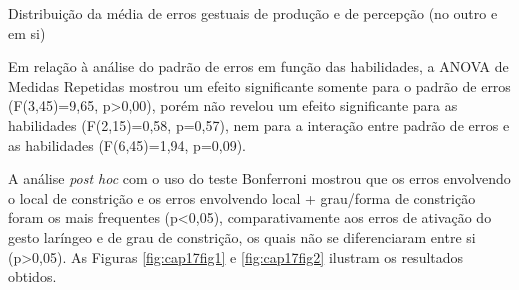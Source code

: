 \documentclass[output=paper,colorlinks,citecolor=brown,booklanguage=portuguese]{langscibook}
\begin{document}
\begin{Tabela}
    \caption{{Distribuição da média de erros gestuais de produção e de percepção (no outro e em si) \citep[96]{Berti2019}}}
    \label{tab:cap17tab2}
\end{Tabela}

Em relação à análise do padrão de erros em função das habilidades, a ANOVA de Medidas Repetidas mostrou um efeito significante somente para o padrão de erros (F(3,45)=9,65, p>0,00), porém não revelou um efeito significante para as habilidades (F(2,15)=0,58, p=0,57), nem para a interação entre padrão de erros e as habilidades (F(6,45)=1,94, p=0,09).

A análise \emph{post hoc} com o uso do teste Bonferroni mostrou que os erros envolvendo o local de constrição e os erros envolvendo local + grau/forma de constrição foram os mais frequentes (p<0,05), comparativamente aos erros de ativação do gesto laríngeo e de grau de constrição, os quais não se diferenciaram entre si (p>0,05). As Figuras \ref{fig:cap17fig1} e \ref{fig:cap17fig2} ilustram os resultados obtidos.
\end{document}
